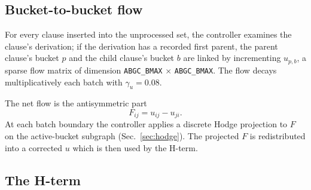 \documentclass[11pt]{article}
\newcommand{\lid}[1]{{\ttfamily\nolinkurl{#1}}}
\begin{document}
\subsection{Bucket-to-bucket flow}

For every clause inserted into the unprocessed set, the controller examines
the clause's derivation; if the derivation has a recorded first parent, the
parent clause's bucket $p$ and the child clause's bucket $b$ are linked by
incrementing $u_{p,b}$, a sparse flow matrix of dimension
\lid{ABGC_BMAX} $\times$ \lid{ABGC_BMAX}. The flow decays multiplicatively each batch with
$\gamma_u = 0.08$.

The net flow is the antisymmetric part
\begin{equation}
   F_{ij} = u_{ij} - u_{ji}.
\end{equation}
At each batch boundary the controller applies a discrete Hodge projection
to $F$ on the active-bucket subgraph (Sec.~\ref{sec:hodge}). The projected
$F$ is redistributed into a corrected $u$ which is then used by the H-term.

\subsection{The H-term}
\end{document}
